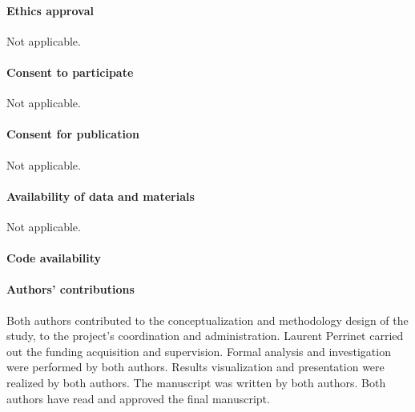 \documentclass[default]{sn-jnl}%
\theoremstyle{thmstyleone}%
\theoremstyle{thmstyletwo}%
\theoremstyle{thmstylethree}%
\begin{document}
\paragraph{Ethics approval}
Not applicable.

\paragraph{Consent to participate}
Not applicable.

\paragraph{Consent for publication}
Not applicable.

\paragraph{Availability of data and materials}
Not applicable.

\paragraph{Code availability}
%
\DataAvailability
%   
\paragraph{Authors' contributions}
%
Both authors contributed to the conceptualization and methodology design of the study, to the project's coordination and administration. Laurent Perrinet carried out the funding acquisition and supervision. Formal analysis and investigation were performed by both authors. Results visualization and presentation were realized by both authors. The manuscript was written by both authors. Both authors have read and approved the final manuscript.


\end{document}
